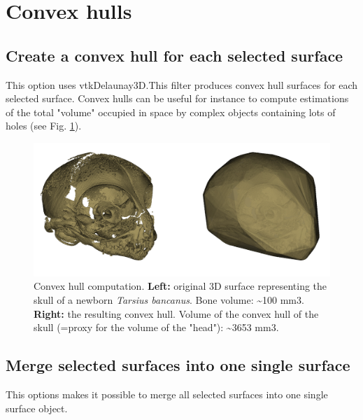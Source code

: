 \section{Convex hulls}
\subsection{Create a convex hull for each selected surface}
This option uses vtkDelaunay3D.This filter produces convex hull surfaces for each selected surface. Convex hulls can be useful for instance to compute estimations of the total "volume" occupied in space by complex objects containing lots of holes (see Fig. \ref{convex_hull}). 

\begin{figure}
  \centering
  \includegraphics[scale=0.27]{images/09/structure/convex_hull.png} 
	\caption{Convex hull computation. \textbf{Left:} original 3D surface representing the skull of a newborn \textit{Tarsius bancanus}. Bone volume: \textasciitilde100 mm3. \textbf{Right:} the resulting convex hull. Volume of the convex hull of the skull (=proxy for the volume of the "head"): \textasciitilde3653 mm3.}
\label{convex_hull}
 
\end{figure}

\subsection{Merge selected surfaces into one single surface}
This options makes it possible to merge all selected surfaces into one single surface object. 


